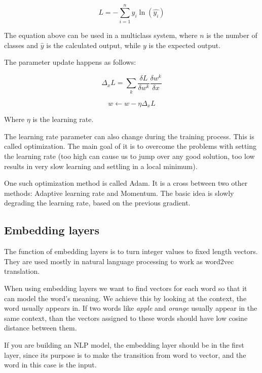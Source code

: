\[L = - \sum_{i=1}^{n} y_i \ln(\hat{y_i})\]

The equation above can be used in a multiclass system, where \(n\) is the number of classes and \(\hat{y}\) is the calculated output, while \(y\) is the expected output.

The parameter update happens as follows:

\[\Delta_x L = \sum_{k} \frac{\delta L}{\delta w^k}\frac{\delta w^k}{\delta x}\]

\[w \leftarrow w - \eta \Delta_x L\]

Where \(\eta\) is the learning rate.

The learning rate parameter can also change during the training process. This is called optimization. The main goal of it is to overcome the problems with setting the learning rate (too high can cause us to jump over any good solution, too low results in very slow learning and settling in a local minimum).

One such optimization method is called Adam. It is a cross between two other methods: Adaptive learning rate and Momentum. The basic idea is slowly degrading the learning rate, based on the previous gradient.

\subsection{Embedding layers}

The function of embedding layers is to turn integer values to fixed length vectors. They are used mostly in natural language processing to work as word2vec translation.

When using embedding layers we want to find vectors for each word so that it can model the word's meaning. We achieve this by looking at the context, the word usually appears in. If two words like \textit{apple} and \textit{orange} usually appear in the same context, than the vectors assigned to these words should have low cosine distance between them.

If you are building an NLP model, the embedding layer should be in the first layer, since its purpose is to make the transition from word to vector, and the word in this case is the input.

